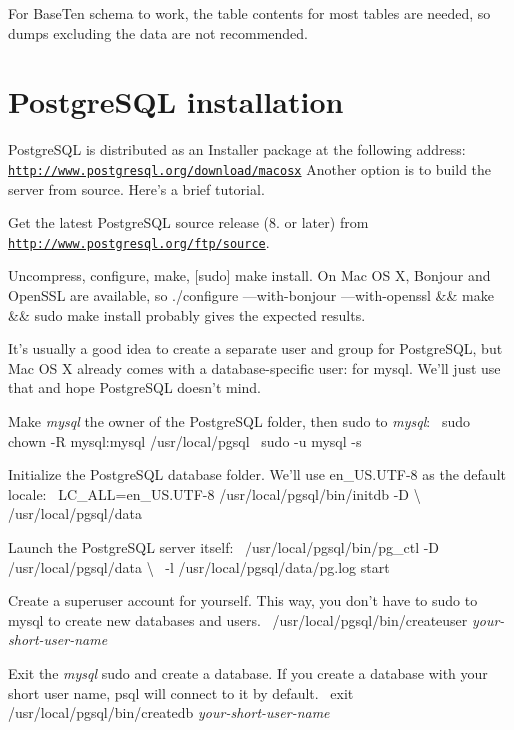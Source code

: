 For Base\+Ten schema to work, the table contents for most tables are needed, so dumps excluding the data are not recommended. \hypertarget{postgresql_installation}{}\section{Postgre\+S\+Q\+L installation}\label{postgresql_installation}
Postgre\+S\+Q\+L is distributed as an Installer package at the following address\+:~\newline
 \href{http://www.postgresql.org/download/macosx}{\tt http\+://www.\+postgresql.\+org/download/macosx} Another option is to build the server from source. Here's a brief tutorial. 
\begin{DoxyEnumerate}
\item Get the latest Postgre\+S\+Q\+L source release (8. or later) from \href{http://www.postgresql.org/ftp/source}{\tt http\+://www.\+postgresql.\+org/ftp/source}. 
\item Uncompress, configure, make, \mbox{[}sudo\mbox{]} make install. On Mac O\+S X, Bonjour and Open\+S\+S\+L are available, so {\ttfamily ./configure ---\/with-\/bonjour ---\/with-\/openssl \&\& make \&\& sudo make install} probably gives the expected results. 
\item It's usually a good idea to create a separate user and group for Postgre\+S\+Q\+L, but Mac O\+S X already comes with a database-\/specific user\+: for mysql. We'll just use that and hope Postgre\+S\+Q\+L doesn't mind. 
\item Make {\itshape mysql} the owner of the Postgre\+S\+Q\+L folder, then sudo to {\itshape mysql}\+:~\newline
 {\ttfamily  sudo chown -\/\+R mysql\+:mysql /usr/local/pgsql~\newline
 sudo -\/u mysql -\/s }  
\item Initialize the Postgre\+S\+Q\+L database folder. We'll use en\+\_\+\+U\+S.\+U\+T\+F-\/8 as the default locale\+:~\newline
{\ttfamily L\+C\+\_\+\+A\+L\+L=en\+\_\+\+U\+S.\+U\+T\+F-\/8 /usr/local/pgsql/bin/initdb -\/\+D \textbackslash{}~\newline
 /usr/local/pgsql/data} 
\item Launch the Postgre\+S\+Q\+L server itself\+:~\newline
 {\ttfamily  /usr/local/pgsql/bin/pg\+\_\+ctl -\/\+D /usr/local/pgsql/data \textbackslash{}~\newline
 -\/l /usr/local/pgsql/data/pg.log start } 
\item Create a superuser account for yourself. This way, you don't have to sudo to mysql to create new databases and users.~\newline
 {\ttfamily /usr/local/pgsql/bin/createuser {\itshape your-\/short-\/user-\/name}}  
\item Exit the {\itshape mysql} sudo and create a database. If you create a database with your short user name, psql will connect to it by default.~\newline
 {\ttfamily  exit~\newline
 /usr/local/pgsql/bin/createdb {\itshape your-\/short-\/user-\/name} }  
\end{DoxyEnumerate}